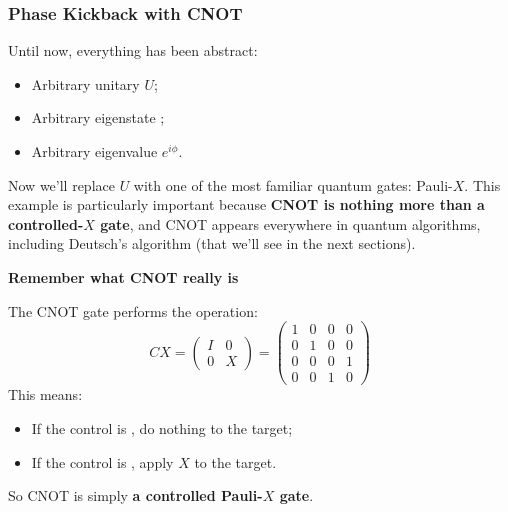 \subsubsection{Phase Kickback with CNOT}\label{ex:phase-kickback-with-cnot}

Until now, everything has been abstract:
\begin{itemize}
    \item Arbitrary unitary $U$;
    \item Arbitrary eigenstate ;
    \item Arbitrary eigenvalue $e^{i\phi}$.
\end{itemize}
Now we'll replace $U$ with one of the most familiar quantum gates: Pauli-$X$. This example is particularly important because \textbf{CNOT is nothing more than a controlled-$X$ gate}, and CNOT appears everywhere in quantum algorithms, including Deutsch's algorithm (that we'll see in the next sections).

\highspace
\begin{flushleft}
    \textcolor{Green3}{ \textbf{Remember what CNOT really is}}
\end{flushleft}
The CNOT gate performs the operation:
\begin{equation*}
    CX = \begin{pmatrix}
        I & 0 \\
        0 & X
    \end{pmatrix} =
    \begin{pmatrix}
        1 & 0 & 0 & 0 \\
        0 & 1 & 0 & 0 \\
        0 & 0 & 0 & 1 \\
        0 & 0 & 1 & 0
    \end{pmatrix}
\end{equation*}
This means:
\begin{itemize}
    \item If the control is , do nothing to the target;
    \item If the control is , apply $X$ to the target.
\end{itemize}
So CNOT is simply \textbf{a controlled Pauli-$X$ gate}.

